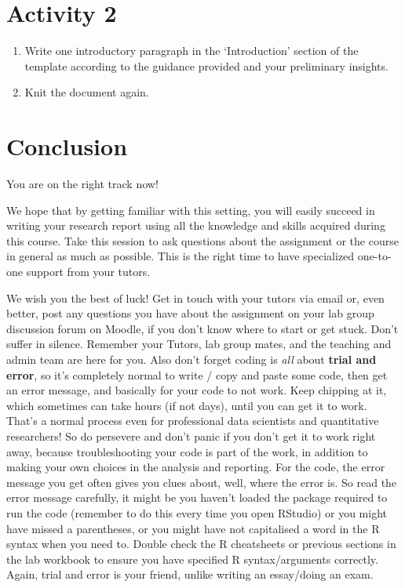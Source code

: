\documentclass[
]{book}
\providecommand{\tightlist}{%
  \setlength{\itemsep}{0pt}\setlength{\parskip}{0pt}}
\begin{document}
\hypertarget{activity-2-3}{%
\section{Activity 2}\label{activity-2-3}}

\begin{enumerate}
\def\labelenumi{\arabic{enumi}.}
\tightlist
\item
  Write one introductory paragraph in the `Introduction' section of the template according to the guidance provided and your preliminary insights.
\item
  Knit the document again.
\end{enumerate}

\hypertarget{conclusion}{%
\section{Conclusion}\label{conclusion}}

You are on the right track now!

We hope that by getting familiar with this setting, you will easily succeed in writing your research report using all the knowledge and skills acquired during this course. Take this session to ask questions about the assignment or the course in general as much as possible. This is the right time to have specialized one-to-one support from your tutors.

We wish you the best of luck! Get in touch with your tutors via email or, even better, post any questions you have about the assignment on your lab group discussion forum on Moodle, if you don't know where to start or get stuck. Don't suffer in silence. Remember your Tutors, lab group mates, and the teaching and admin team are here for you. Also don't forget coding is \emph{all} about \textbf{trial and error}, so it's completely normal to write / copy and paste some code, then get an error message, and basically for your code to not work. Keep chipping at it, which sometimes can take hours (if not days), until you can get it to work. That's a normal process even for professional data scientists and quantitative researchers! So do persevere and don't panic if you don't get it to work right away, because troubleshooting your code is part of the work, in addition to making your own choices in the analysis and reporting. For the code, the error message you get often gives you clues about, well, where the error is. So read the error message carefully, it might be you haven't loaded the package required to run the code (remember to do this every time you open RStudio) or you might have missed a parentheses, or you might have not capitalised a word in the R syntax when you need to. Double check the R cheatsheets or previous sections in the lab workbook to ensure you have specified R syntax/arguments correctly. Again, trial and error is your friend, unlike writing an essay/doing an exam.
\end{document}
